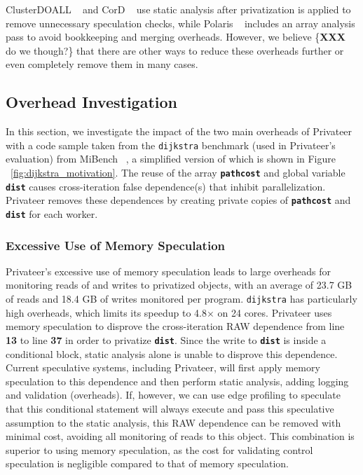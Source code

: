 ClusterDOALL ~\cite{kim:12:cgo} and CorD ~\cite{ctian:2008:micro} use
static analysis after privatization is applied to remove unnecessary
speculation checks, while Polaris ~\cite{tu:94:lcpc} includes an array
analysis pass to avoid bookkeeping and merging overheads. However, we
believe \{\textbf{XXX} do we though?\} that there are other ways to reduce
these overheads further or even completely remove them in many cases.

\subsection{Overhead Investigation}
In this section, we investigate the impact of the two main overheads of
Privateer with a code sample taken from the \texttt{dijkstra} benchmark
(used in Privateer's evaluation) from MiBench ~\cite{}, a simplified
version of which is shown in Figure ~\ref{fig:dijkstra_motivation}.
The reuse of the array \texttt{\textbf{pathcost}} and global variable
\texttt{\textbf{dist}} causes cross-iteration false dependence(s) that
inhibit parallelization. Privateer removes these dependences by creating
private copies of \texttt{\textbf{pathcost}} and \texttt{\textbf{dist}}
for each worker.

\subsubsection{Excessive Use of Memory Speculation}
Privateer's excessive use of memory speculation leads to large overheads
for monitoring reads of and writes to privatized objects, with an average
of 23.7 GB of reads and 18.4 GB of writes monitored per program.
\texttt{dijkstra} has particularly high overheads, which limits its speedup
to 4.8$\times$ on 24 cores.
Privateer uses memory speculation to disprove the cross-iteration RAW
dependence from line \textbf{13} to line \textbf{37} in order to privatize
\texttt{\textbf{dist}}. Since the write to \texttt{\textbf{dist}} is inside
a conditional block, static analysis alone is unable to disprove this
dependence. Current speculative systems, including Privateer, will first
apply memory speculation to this dependence and then perform static analysis,
adding logging and validation (overheads). If, however, we can use edge
profiling to speculate that this conditional statement will always execute
and pass this speculative assumption to the static analysis, this RAW
dependence can be removed with minimal cost, avoiding all monitoring of reads to
this object. This combination is superior to using memory speculation,
as the cost for validating control speculation is negligible compared to
that of memory speculation.

